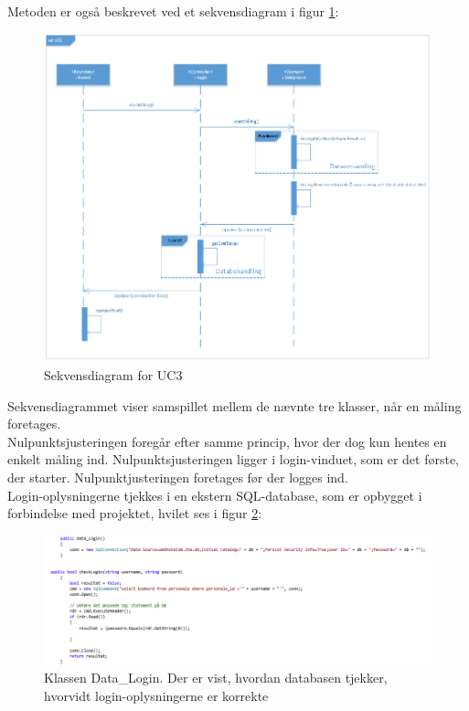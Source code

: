 Metoden er også beskrevet ved et sekvensdiagram i figur \ref{UC3sekvens}:

\begin{figure}[H]
	\includegraphics[width=1\textwidth]{Figurer/Softwareimplementering/UC3_sekvens}
	\caption{Sekvensdiagram for UC3}
	\label{UC3sekvens}
\end{figure}
Sekvensdiagrammet viser samspillet mellem de nævnte tre klasser, når en måling foretages.\\
Nulpunktsjusteringen foregår efter samme princip, hvor der dog kun hentes en enkelt måling ind. Nulpunktsjusteringen ligger i login-vinduet, som er det første, der starter. Nulpunktjusteringen foretages før der logges ind.\\
Login-oplysningerne tjekkes i en ekstern SQL-database, som er opbygget i forbindelse med projektet, hvilet ses i figur \ref{kode8}:

\begin{figure}[H]
	\includegraphics[width=1.2\textwidth]{Figurer/Jeppe/8}
	\caption{Klassen Data\_Login. Der er vist, hvordan databasen tjekker, hvorvidt login-oplysningerne er korrekte}
	\label{kode8}
\end{figure}
 

